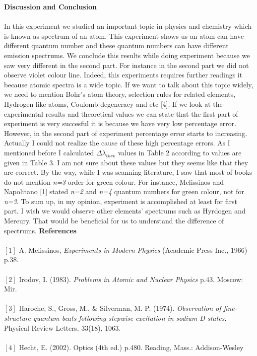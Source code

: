 \documentclass[a4paper,12pt]{article}
\begin{document}
\textbf{Discussion and Conclusion}\\\\
In this experiment we studied an important topic in physics and chemistry which is known as spectrum of an atom. This experiment shows us an atom can have different quantum number and these quantum numbers can have different emission spectrums. We conclude this results while doing experiment because we saw very different in the second part. For instance in the second part we did not observe violet colour line. Indeed, this experiments requires further readings it because atomic spectra is a wide topic. If we want to talk about this topic widely, we need to mention Bohr's atom theory, selection rules for related elements, Hydrogen like atoms, Coulomb degeneracy and etc [4]. If we look at the experimental results and theoretical values we can state that the first part of experiment is very succesful it is because we have very low percentage error. However, in the second part of experiment percentage error starts to increasing. Actually I could not realize the cause of these high percentage errors. As I mentioned before I calculated $\Delta\lambda_{theo}$ values in Table 2 according to values are given in Table 3. I am not sure about these values but they seems like that they are correct. By the way, while I was scanning literature, I saw that most of books do not mention \textit{n=3} order for green colour. For instance, Melissinos and Napolitano [1] stated \textit{n=2} and \textit{n=4} quantum numbers for green colour, not for \textit{n=3}. To sum up, in my opinion, experiment is accomplished at least for first part. I wish we would observe other elements' spectrums such as Hyrdogen and Mercury. That would be beneficial for us to understand the difference of spectrums.
\newpage
\textbf{References}\\\\
$[1]$ A. Melissinos, \textit{Experiments in Modern Physics} (Academic
Press Inc., 1966) p.38.\\\\
$[2]$ Irodov, I. (1983). \textit{Problems in Atomic and Nuclear Physics} p.43. Moscow: Mir.\\\\
$[3]$ Haroche, S., Gross, M., \& Silverman, M. P. (1974). \textit{Observation of fine-structure quantum beats following stepwise excitation in sodium D states.} Physical Review Letters, 33(18), 1063.\\\\
$[4]$ Hecht,  E. (2002). Optics (4th ed.)  p.480.  Reading,  Mass.:  Addison-Wesley\\\\\\
\end{document}
